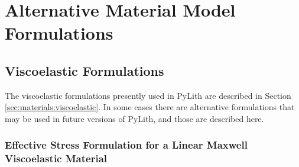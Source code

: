 
\chapter{\label{cha:materials:alternative:formulations}Alternative Material Model Formulations}


\section{\label{sec:ViscoelasticFormulations}Viscoelastic Formulations}

The viscoelastic formulations presently used in PyLith are described
in Section \vref{sec:materials:viscoelastic}. In some cases there
are alternative formulations that may be used in future versions of
PyLith, and those are described here.


\subsection{\label{sub:Effective-Stress-Formulation-Maxwell}Effective Stress
Formulation for a Linear Maxwell Viscoelastic Material}

